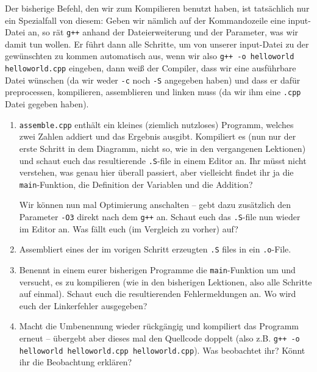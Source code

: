 Der bisherige Befehl, den wir zum Kompilieren benutzt haben, ist tatsächlich
nur ein Spezialfall von diesem: Geben wir nämlich auf der Kommandozeile eine
input-Datei an, so rät \texttt{g++} anhand der Dateierweiterung und der
Parameter, was wir damit tun wollen. Er führt dann alle Schritte, um von
unserer input-Datei zu der gewünschten zu kommen automatisch aus, wenn wir also
\texttt{g++ -o helloworld helloworld.cpp} eingeben, dann weiß der Compiler,
dass wir eine ausführbare Datei wünschen (da wir weder \texttt{-c} noch
\texttt{-S} angegeben haben) und dass er dafür preprocessen, kompilieren, assemblieren und
linken muss (da wir ihm eine \texttt{.cpp} Datei gegeben haben).
\begin{praxis}
    \begin{enumerate}
        \item \texttt{assemble.cpp} enthält ein kleines (ziemlich nutzloses)
              Programm, welches zwei Zahlen addiert und das Ergebnis ausgibt.
              Kompiliert es (nun nur der erste Schritt in dem Diagramm, nicht so, wie
              in den vergangenen Lektionen) und schaut euch das resultierende
              \texttt{.S}-file in einem Editor an. Ihr müsst nicht verstehen,
              was genau hier überall passiert, aber vielleicht findet ihr ja die
              \texttt{main}-Funktion, die Definition der Variablen und die Addition?

              Wir können nun mal Optimierung anschalten -- gebt dazu zusätzlich den
              Parameter \texttt{-O3} direkt nach dem \texttt{g++} an. Schaut euch das
              \texttt{.S}-file nun wieder im Editor an. Was fällt euch
              (im Vergleich zu vorher) auf?
        \item Assembliert eines der im vorigen Schritt erzeugten \texttt{.S} files
              in ein \texttt{.o}-File.
        \item Benennt in einem eurer bisherigen Programme die
              \texttt{main}-Funktion um und versucht, es zu kompilieren (wie in den
              bisherigen Lektionen, also alle Schritte auf einmal). Schaut euch die
              resultierenden Fehlermeldungen an. Wo wird euch der Linkerfehler
              ausgegeben?
        \item Macht die Umbenennung wieder rückgängig und kompiliert das Programm
              erneut -- übergebt aber dieses mal den Quellcode doppelt (also z.B.
              \texttt{g++ -o helloworld helloworld.cpp helloworld.cpp}). Was
              beobachtet ihr? Könnt ihr die Beobachtung erklären?
    \end{enumerate}

\end{praxis}
